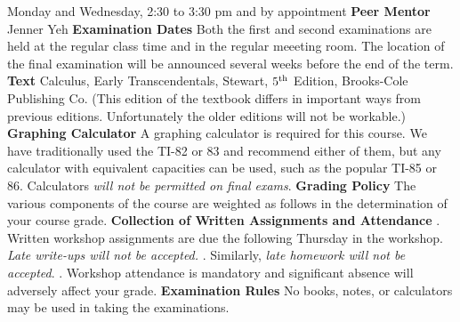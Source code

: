  \enspace Monday and Wednesday, 2:30 to 3:30 pm
and by appointment
\bigskip
{\bf Peer Mentor} \enspace Jenner Yeh
\bigskip
{\bf Examination Dates}
\smallskip
{}
\smallskip
Both the first and second examinations are held at the regular class time and
in the regular meeeting room. The location of the final examination
will be announced several weeks before the end of the term.
\bigskip
{\bf Text} \enspace 
Calculus, Early Transcendentals, Stewart, $5^{\rm th}$ Edition,
Brooks-Cole Publishing Co. (This edition of the textbook differs in 
important ways from previous editions. Unfortunately the older editions 
will not be workable.) 
\bigskip
{\bf Graphing Calculator} \enspace 
A graphing calculator is required for this course. 
We have traditionally used the TI-82 or 83 and recommend either of them, 
but any calculator with equivalent capacities can be used, such as the 
popular TI-85 or 86. Calculators {\it will not be permitted on final exams}. 
\bigskip
{\bf Grading Policy} \enspace 
The various components of the course are weighted
as follows in the determination of your course grade.
\smallskip
{}
\bigskip
{\bf Collection of Written Assignments and Attendance} %
{}. Written workshop assignments are due the following Thursday in the
workshop. {\it Late write-ups will not be accepted.} \hfil{}. Similarly,  {\it late homework will
not be accepted}. \hfil{}. Workshop attendance is mandatory and significant absence will
adversely affect your grade.
\bigskip
{\bf Examination Rules} %
\smallskip
No books, notes, or calculators may be used in taking
the examinations.

